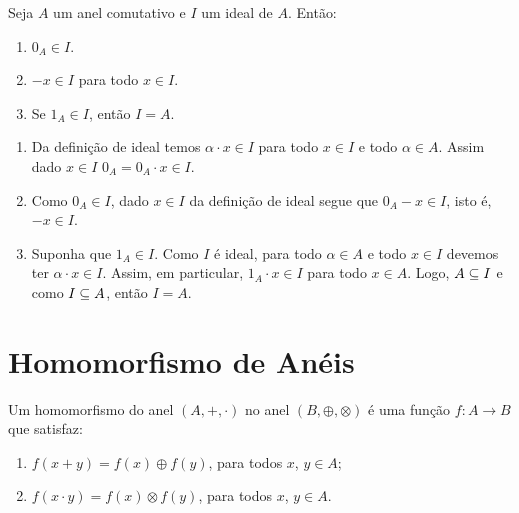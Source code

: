 \begin{proposicao}
	Seja $A$ um anel comutativo e $I$ um ideal de $A$. Ent{\~a}o:
	\begin{enumerate}[label={\roman*})]
	 	\item $0_{A}\in I$.
	 	\item $-x \in I$ para todo $x \in I$.
	 	\item Se $1_A \in I$, ent\~ao $I = A$.
	\end{enumerate}
\end{proposicao}
\begin{prova}
	\begin{enumerate}[label={\roman*})]
		\item Da defini\c{c}\~ao de ideal temos $\alpha \cdot x \in I$ para todo $x \in I$ e todo $\alpha \in A$.
		Assim dado $x \in I$ $0_A = 0_A \cdot x \in I$.

		\item Como $0_A \in I$, dado $x \in I$ da defini\c{c}\~ao de ideal segue que $0_A - x \in I$, isto \'e, $-x \in I$.

		\item Suponha que $1_A \in I$. Como $I$ {\'e} ideal, para todo $\alpha \in A$ e todo $x \in I$ devemos ter $\alpha\cdot x \in I$. Assim, em particular, $1_A \cdot x \in I$ para todo $x \in A$. Logo, $A\subseteq I$ e como $I\subseteq A$, ent{\~a}o $I = A$.
	\end{enumerate}
\end{prova}

\section{Homomorfismo de An\'eis} %
\label{sec:homomorfismo_de_aneis}

\begin{definicao}
	Um homomorfismo do anel $(A, +, \cdot)$ no anel $(B, \oplus, \otimes)$ {\'e} uma fun{\c c}{\~a}o $f : A \to B$ que satisfaz:
	\begin{enumerate}[label={\roman*})]
		\item $f(x + y) = f(x) \oplus f(y)$, para todos $x$, $y \in A$;
		\item $f(x \cdot y) = f(x)\otimes f(y)$, para todos $x$, $y \in A$.
	\end{enumerate}
\end{definicao}

